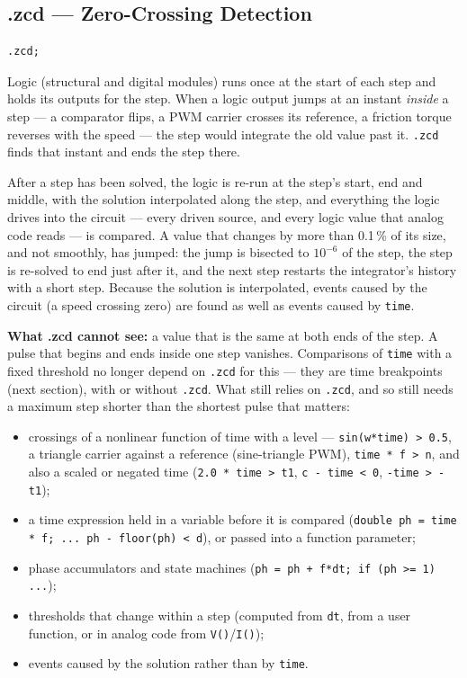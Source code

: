\documentclass[11pt, a4paper]{article}
\newcommand{\code}[1]{\texttt{\small #1}}
\begin{document}
\subsection{.zcd — Zero-Crossing Detection}

\begin{lstlisting}
.zcd;
\end{lstlisting}

Logic (structural and digital modules) runs once at the start of each step
and holds its outputs for the step. When a logic output jumps at an instant
\emph{inside} a step --- a comparator flips, a PWM carrier crosses its
reference, a friction torque reverses with the speed --- the step would
integrate the old value past it. \code{.zcd} finds that instant and ends the
step there.

After a step has been solved, the logic is re-run at the step's start, end and
middle, with the solution interpolated along the step, and everything the logic
drives into the circuit --- every driven source, and every logic value that
analog code reads --- is compared. A value that changes by more than 0.1\,\%
of its size, and not smoothly, has jumped: the jump is bisected to
\(10^{-6}\) of the step, the step is re-solved to end just after it, and the
next step restarts the integrator's history with a short step. Because the
solution is interpolated, events caused by the circuit (a speed crossing zero)
are found as well as events caused by \code{time}.

\textbf{What .zcd cannot see:} a value that is the same at both ends of the
step. A pulse that begins and ends inside one step vanishes. Comparisons of
\code{time} with a fixed threshold no longer depend on \code{.zcd} for this ---
they are time breakpoints (next section), with or without \code{.zcd}. What
still relies on \code{.zcd}, and so still needs a maximum step shorter than
the shortest pulse that matters:

\begin{itemize}
  \item crossings of a nonlinear function of time with a level ---
        \code{sin(w*time) > 0.5}, a triangle carrier against a reference
        (sine-triangle PWM), \code{time * f > n}, and also a scaled or
        negated time (\code{2.0 * time > t1}, \code{c - time < 0},
        \code{-time > -t1});
  \item a time expression held in a variable before it is compared
        (\code{double ph = time * f; ... ph - floor(ph) < d}), or passed into
        a function parameter;
  \item phase accumulators and state machines (\code{ph = ph + f*dt; if (ph >= 1) ...});
  \item thresholds that change within a step (computed from \code{dt}, from a
        user function, or in analog code from \code{V()}/\code{I()});
  \item events caused by the solution rather than by \code{time}.
\end{itemize}
\end{document}
